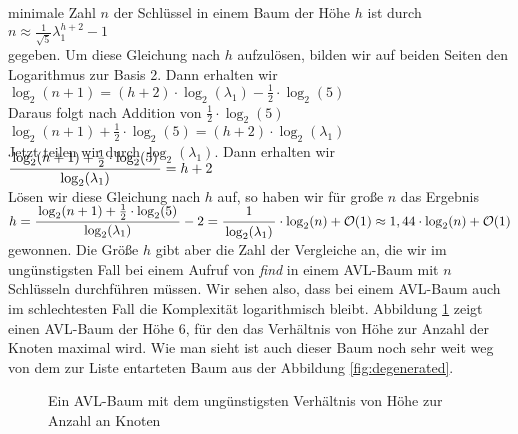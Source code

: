 minimale Zahl $n$ der Schl\"ussel in einem Baum der H\"ohe $h$ ist durch \\[0.2cm]
\hspace*{1.3cm} $n \approx \displaystyle \frac{1}{\sqrt{5}} \lambda_1^{h+2} - 1$ \\[0.2cm]
gegeben.  Um diese Gleichung nach $h$ aufzul\"osen, bilden wir auf beiden Seiten den
Logarithmus zur Basis 2.  Dann erhalten wir 
\\[0.2cm]
\hspace*{1.3cm}
$\log_2(n+1) = (h+2) \cdot \log_2(\lambda_1) - \frac{1}{2}\cdot \log_2(5)$
\\[0.2cm]
Daraus folgt nach Addition von $\frac{1}{2}\cdot \log_2(5)$
\\[0.2cm]
\hspace*{1.3cm}
$\log_2(n+1) + \frac{1}{2}\cdot \log_2(5) = (h+2) \cdot \log_2(\lambda_1)$
\\[0.2cm]
Jetzt teilen wir durch $\log_2(\lambda_1)$.  Dann erhalten wir 
\\[0.4cm]
\hspace*{1.3cm}
$\displaystyle \bruch{\log_2(n+1) + \frac{1}{2}\cdot \log_2(5)}{\log_2(\lambda_1)} = h+2$
\\[0.2cm]
L\"osen wir diese Gleichung nach $h$ auf, so haben wir f\"ur gro{\ss}e $n$
das Ergebnis
\\[0.4cm]
\hspace*{0.3cm} 
$h = \displaystyle \bruch{\log_2(n+1) + \frac{1}{2}\cdot \log_2(5)}{\log_2(\lambda_1)} - 2 =
      \bruch{1}{\log_2(\lambda_1)}\cdot \log_2(n) + \Oh(1) \approx 1,44 \cdot \log_2(n) + \Oh(1)$ 
\\[0.2cm]
gewonnen. 
Die Gr\"o{\ss}e $h$ gibt aber die Zahl der Vergleiche an, die wir im ung\"unstigsten Fall bei
einem Aufruf von \textsl{find} in einem AVL-Baum mit $n$ Schl\"usseln durchf\"uhren m\"ussen.
Wir sehen also, dass bei einem AVL-Baum auch im schlechtesten Fall die Komplexit\"at
logarithmisch bleibt.  Abbildung
\ref{fig:avl-worst-case} zeigt einen AVL-Baum der H\"ohe 6, f\"ur den das Verh\"altnis von H\"ohe zur Anzahl
der Knoten maximal wird.  Wie man sieht ist auch dieser Baum noch sehr weit weg von dem
zur Liste entarteten Baum aus der Abbildung \ref{fig:degenerated}.


\begin{figure}[!ht]
  \centering
  \caption{Ein AVL-Baum mit dem ung\"unstigsten Verh\"altnis von H\"ohe zur Anzahl an Knoten}
  \label{fig:avl-worst-case}
\end{figure}
\pagebreak
\vspace*{\fill}

